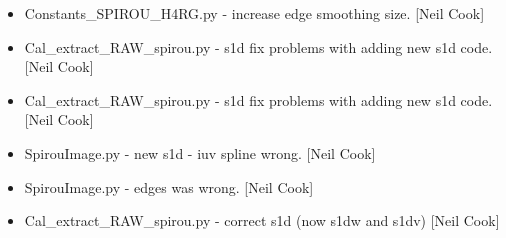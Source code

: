 \documentclass[a4paper,10pt,english]{report}
\begin{document}
\begin{itemize}
\item {} 
Constants\_SPIROU\_H4RG.py - increase edge smoothing size. {[}Neil Cook{]}

\item {} 
Cal\_extract\_RAW\_spirou.py - s1d fix problems with adding new s1d code.
{[}Neil Cook{]}

\item {} 
Cal\_extract\_RAW\_spirou.py - s1d fix problems with adding new s1d code.
{[}Neil Cook{]}

\item {} 
SpirouImage.py - new s1d - iuv spline wrong. {[}Neil Cook{]}

\item {} 
SpirouImage.py - edges was wrong. {[}Neil Cook{]}

\item {} 
Cal\_extract\_RAW\_spirou.py - correct s1d (now s1dw and s1dv) {[}Neil
Cook{]}

\end{itemize}
\end{document}
